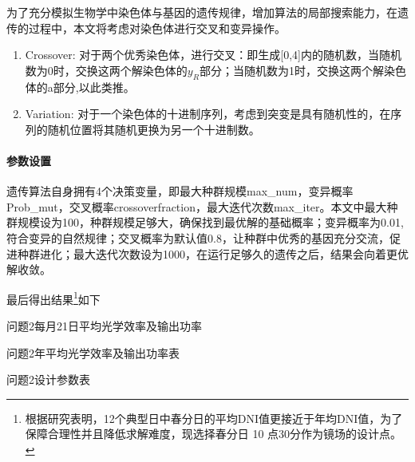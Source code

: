 	为了充分模拟生物学中染色体与基因的遗传规律，增加算法的局部搜索能力，在遗传的过程中，本文将考虑对染色体进行交叉和变异操作。
\begin{enumerate}
\item 
Crossover:
对于两个优秀染色体，进行交叉：即生成[0,4]内的随机数，当随机数为0时，交换这两个解染色体的\(y_{R}\)部分；当随机数为1时，交换这两个解染色体的a部分,以此类推。
\medskip
\item 
Variation:
对于一个染色体的十进制序列，考虑到突变是具有随机性的，在序列的随机位置将其随机更换为另一个十进制数。
\end{enumerate}

\paragraph{参数设置}
遗传算法自身拥有4个决策变量，即最大种群规模max\_num，变异概率
Prob\_mut，交叉概率crossoverfraction，最大迭代次数max\_iter。本文中最大种群规模设为100，种群规模足够大，确保找到最优解的基础概率；变异概率为0.01,符合变异的自然规律；交叉概率为默认值0.8，让种群中优秀的基因充分交流，促进种群进化；最大迭代次数设为1000，在运行足够久的遗传之后，结果会向着更优解收敛。

最后得出结果\footnote{根据研究表明，12个典型日中春分日的平均DNI值更接近于年均DNI值，为了保障合理性并且降低求解难度，现选择春分日 10 点30分作为镜场的设计点。}如下
%
\begin{table}[H]
\centering
\caption{\kaishu 问题2每月21日平均光学效率及输出功率}

\end{table}
%
\begin{table}[H]
\centering
\caption{\kaishu 问题2年平均光学效率及输出功率表}

\end{table}
%
\begin{table}[H]
\centering
\caption{\kaishu 问题2设计参数表}

\end{table}
%

